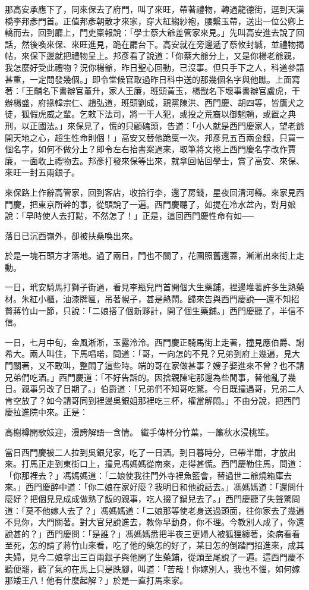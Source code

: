 那高安承應下了，同來保去了府門，叫了來旺，帶著禮物，轉過龍德街，逕到天漢橋李邦彥門首。正值邦彥朝散才來家，穿大紅縐紗袍，腰繫玉帶，送出一位公卿上轎而去，回到廳上，門吏稟報說：「學士蔡大爺差管家來見。」先叫高安進去說了回話，然後喚來保、來旺進見，跪在廳台下。高安就在旁邊遞了蔡攸封緘，並禮物揭帖，來保下邊就把禮物呈上。邦彥看了說道：「你蔡大爺分上，又是你楊老爺親，我怎麼好受此禮物？況你楊爺，昨日聖心回動，已沒事。但只手下之人，科道參語甚重，一定問發幾個。」即令堂候官取過昨日科中送的那幾個名字與他瞧。上面寫著：「王黼名下書辦官董升，家人王廉，班頭黃玉，楊戩名下壞事書辦官盧虎，干辦楊盛，府掾韓宗仁、趙弘道，班頭劉成，親黨陳洪、西門慶、胡四等，皆鷹犬之徒，狐假虎威之輩。乞敕下法司，將一干人犯，或投之荒裔以御魍魎，或置之典刑，以正國法。」來保見了，慌的只顧磕頭，告道：「小人就是西門慶家人，望老爺開天地之心，超生性命則個！」高安又替他跪稟一次。邦彥見五百兩金銀，只買一個名字，如何不做分上？即令左右抬書案過來，取筆將文捲上西門慶名字改作賈廉，一面收上禮物去。邦彥打發來保等出來，就拿回帖回學士，賞了高安、來保、來旺一封五兩銀子。

來保路上作辭高管家，回到客店，收拾行李，還了房錢，星夜回清河縣。來家見西門慶，把東京所幹的事，從頭說了一遍。西門慶聽了，如提在冷水盆內，對月娘說：「早時使人去打點，不然怎了！」正是，這回西門慶性命有如──

落日已沉西嶺外，卻被扶桑喚出來。

於是一塊石頭方才落地。過了兩日，門也不關了，花園照舊還蓋，漸漸出來街上走動。

一日，玳安騎馬打獅子街過，看見李瓶兒門首開個大生藥鋪，裡邊堆著許多生熟藥材。朱紅小櫃，油漆牌匾，吊著幌子，甚是熱鬧。歸來告與西門慶說──還不知招贅蔣竹山一節，只說：「二娘搭了個新夥計，開了個生藥鋪。」西門慶聽了，半信不信。

一日，七月中旬，金風淅淅，玉露泠泠。西門慶正騎馬街上走著，撞見應伯爵、謝希大。兩人叫住，下馬唱喏，問道：「哥，一向怎的不見？兄弟到府上幾遍，見大門關著，又不敢叫，整悶了這些時。端的哥在家做甚事？嫂子娶進來不曾？也不請兄弟們吃酒。」西門慶道：「不好告訴的。因捨親陳宅那邊為些閒事，替他亂了幾日。親事另改了日期了。」伯爵道：「兄弟們不知哥吃驚。今日既撞遇哥，兄弟二人肯空放了？如今請哥同到裡邊吳銀姐那裡吃三杯，權當解悶。」不由分說，把西門慶拉進院中來。正是：

高榭樽開歌妓迎，漫誇解語一含情。
纖手傳杯分竹葉，一簾秋水浸桃笙。

當日西門慶被二人拉到吳銀兒家，吃了一日酒。到日暮時分，已帶半酣，才放出來。打馬正走到東街口上，撞見馮媽媽從南來，走得甚慌。西門慶勒住馬，問道： 「你那裡去？」馮媽媽道：「二娘使我往門外寺裡魚籃會，替過世二爺燒箱庫去來。」西門慶醉中道：「你二娘在家好麼？我明日和他說話去。」馮媽媽道：「還問什麼好？把個見見成成做熟了飯的親事，吃人掇了鍋兒去了。」西門慶聽了失聲驚問道：「莫不他嫁人去了？」馮媽媽道：「二娘那等使老身送過頭面，往你家去了幾遍不見你，大門關著。對大官兒說進去，教你早動身，你不理。今教別人成了，你還說甚的？」西門慶問：「是誰？」馮媽媽悉把半夜三更婦人被狐狸纏著，染病看看至死，怎的請了蔣竹山來看，吃了他的藥怎的好了，某日怎的倒踏門招進來，成其夫婦，見今二娘拿出三百兩銀子與他開了生藥鋪，從頭至尾說了一遍。這西門慶不聽便罷，聽了氣的在馬上只是跌腳，叫道：「苦哉！你嫁別人，我也不惱，如何嫁那矮王八！他有什麼起解？」於是一直打馬來家。


